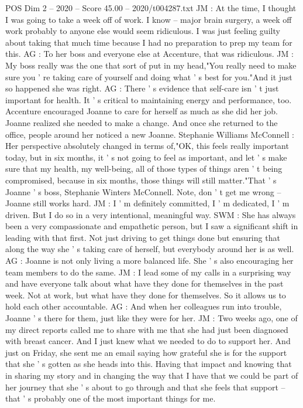 \begin{textsample}{POS Dim 2 – 2020 – Score 45.00 – 2020/t004287.txt}
JM : At the time, I thought I was going to take a week off of work.
I know -- major brain surgery, a week off work probably to anyone else would seem ridiculous.
I was just feeling guilty about taking that much time because I had no preparation to prep my team for this.
AG : To her boss and everyone else at Accenture, that was ridiculous.
JM : My boss really was the one that sort of put in my head,"You really need to make sure you ' re taking care of yourself and doing what ' s best for you."And it just so happened she was right.
AG : There ' s evidence that self-care isn ' t just important for health.
It ' s critical to maintaining energy and performance, too.
Accenture encouraged Joanne to care for herself as much as she did her job.
Joanne realized she needed to make a change.
And once she returned to the office, people around her noticed a new Joanne.
Stephanie Williams McConnell : Her perspective absolutely changed in terms of,"OK, this feels really important today, but in six months, it ' s not going to feel as important, and let ' s make sure that my health, my well-being, all of those types of things aren ' t being compromised, because in six months, those things will still matter."That ' s Joanne ' s boss, Stephanie Winters McConnell.
Note, don ' t get me wrong -- Joanne still works hard.
JM : I ' m definitely committed, I ' m dedicated, I ' m driven.
But I do so in a very intentional, meaningful way.
SWM : She has always been a very compassionate and empathetic person, but I saw a significant shift in leading with that first.
Not just driving to get things done but ensuring that along the way she ' s taking care of herself, but everybody around her is as well.
AG : Joanne is not only living a more balanced life.
She ' s also encouraging her team members to do the same.
JM : I lead some of my calls in a surprising way and have everyone talk about what have they done for themselves in the past week.
Not at work, but what have they done for themselves.
So it allows us to hold each other accountable.
AG : And when her colleagues run into trouble, Joanne ' s there for them, just like they were for her.
JM : Two weeks ago, one of my direct reports called me to share with me that she had just been diagnosed with breast cancer.
And I just knew what we needed to do to support her.
And just on Friday, she sent me an email saying how grateful she is for the support that she ' s gotten as she heads into this.
Having that impact and knowing that in sharing my story and in changing the way that I have that we could be part of her journey that she ' s about to go through and that she feels that support -- that ' s probably one of the most important things for me.

\end{textsample}
